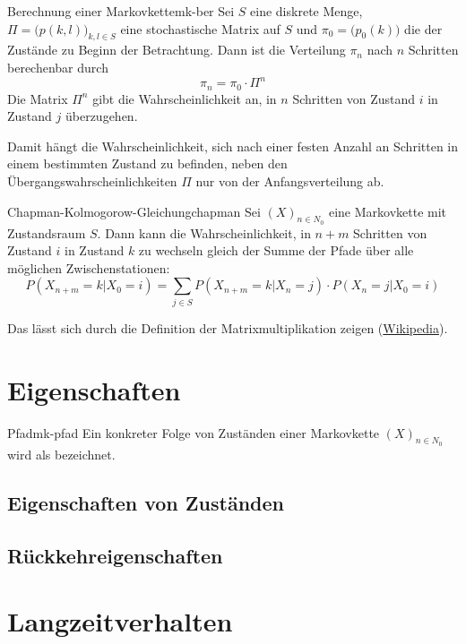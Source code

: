 \begin{theorem}{Berechnung einer Markovkette}{mk-ber}
Sei $S$ eine diskrete Menge, $\Pi = \big(p(k,l)\big)_{k,l\in S}$ eine
stochastische Matrix auf $S$ und $\pi_0 = \big(p_0(k)\big)$ die
 der Zustände zu Beginn der Betrachtung. Dann ist
die Verteilung $\pi_n$ nach $n$ Schritten berechenbar durch
\[
\pi_n = \pi_0\cdot\Pi^n
\]
Die Matrix $\Pi^n$ gibt die Wahrscheinlichkeit an, in $n$ Schritten von
Zustand $i$ in Zustand $j$ überzugehen.
\end{theorem}

Damit hängt die Wahrscheinlichkeit, sich nach einer festen Anzahl an Schritten
in einem bestimmten Zustand zu befinden, neben den Übergangswahrscheinlichkeiten
$\Pi$ nur von der Anfangsverteilung ab.

\begin{theorem}{Chapman-Kolmogorow-Gleichung}{chapman}
Sei $(X)_{n\in N_0}$ eine Markovkette mit Zustandsraum $S$. Dann kann die
Wahrscheinlichkeit, in $n+m$ Schritten von Zustand $i$ in Zustand $k$ zu
wechseln gleich der Summe der Pfade über alle möglichen Zwischenstationen:
\[
P(X_{n+m}=k|X_0=i) = \sum_{j\in S}P(X_{n+m}=k|X_n=j)\cdot P(X_n=j|X_0=i)
\]
\end{theorem}

Das lässt sich durch die Definition der Matrixmultiplikation zeigen
(\href{https://de.wikipedia.org/wiki/Chapman-Kolmogorow-Gleichung}{Wikipedia}).

\section{Eigenschaften}

\begin{definition}{Pfad}{mk-pfad}
Ein konkreter Folge von Zuständen einer Markovkette $(X)_{n\in N_0}$ wird
als  bezeichnet.
\end{definition}

\subsection{Eigenschaften von Zuständen}

\subsection{Rückkehreigenschaften}

\section{Langzeitverhalten}
